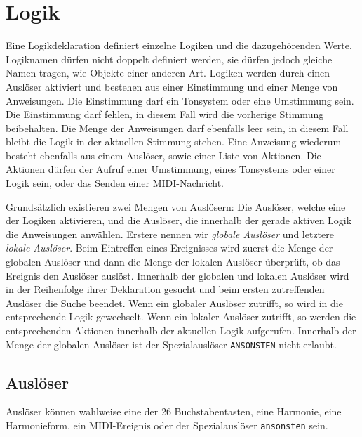 \chapter{Logik}\label{cha:logik}
Eine Logikdeklaration definiert einzelne Logiken und die
dazugehörenden Werte. Logiknamen dürfen nicht doppelt definiert
werden, sie dürfen jedoch gleiche Namen tragen,
wie Objekte einer anderen Art.
Logiken werden durch einen Auslöser aktiviert und
bestehen aus einer Einstimmung
 und einer Menge von Anweisungen.
Die Einstimmung darf ein Tonsystem oder eine Umstimmung sein.
Die Einstimmung darf fehlen, in diesem Fall wird die vorherige Stimmung
beibehalten. Die Menge der Anweisungen darf ebenfalls leer sein, in diesem
Fall bleibt die Logik in der aktuellen Stimmung stehen.
Eine Anweisung wiederum besteht ebenfalls aus einem Auslöser, sowie einer
Liste von Aktionen.
Die Aktionen dürfen der Aufruf einer Umstimmung, eines Tonsystems
oder einer Logik sein, oder das Senden einer MIDI-Nachricht.

Grundsätzlich existieren zwei Mengen von Auslösern: Die Auslöser, welche
eine der Logiken aktivieren, und die Auslöser, die innerhalb der
gerade aktiven Logik die Anweisungen anwählen. Erstere nennen wir
\emph{globale Auslöser}
 und letztere \emph{lokale Auslöser}. Beim Eintreffen
eines Ereignisses wird zuerst die Menge der globalen Auslöser
und dann die Menge der lokalen Auslöser überprüft, ob das Ereignis
den Auslöser auslöst. Innerhalb der globalen und lokalen Auslöser wird
in der Reihenfolge ihrer Deklaration gesucht und beim ersten zutreffenden
Auslöser die Suche beendet.
Wenn ein globaler Auslöser zutrifft, so wird in die entsprechende Logik
gewechselt. Wenn ein lokaler Auslöser zutrifft, so werden die entsprechenden
Aktionen innerhalb der aktuellen Logik aufgerufen.
Innerhalb der Menge der globalen Auslöser ist der Spezialauslöser
\texttt{ANSONSTEN} nicht erlaubt.





\section{Auslöser}\label{sec:ausloser}

Auslöser können wahlweise eine der 26 Buchstabentasten, eine Harmonie,
eine Harmonieform,
ein MIDI-Ereignis oder der Spezialauslöser \texttt{ansonsten} sein.

